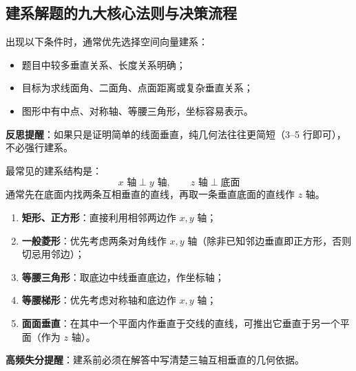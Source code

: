 \documentclass[11pt,a4paper]{ctexart}
\begin{document}
\subsection{建系解题的九大核心法则与决策流程}

\begin{tcolorbox}[colback=white,colframe=rulecolor,boxrule=0.55pt,arc=1mm,title={一、判断是否适合建系},fonttitle=\bfseries]
出现以下条件时，通常优先选择空间向量建系：
\begin{itemize}[leftmargin=2em, itemsep=0.1em]
  \item 题目中较多垂直关系、长度关系明确；
  \item 目标为求线面角、二面角、点面距离或复杂垂直关系；
  \item 图形中有中点、对称轴、等腰三角形，坐标容易表示。
\end{itemize}
\textbf{反思提醒}：如果只是证明简单的线面垂直，纯几何法往往更简短（3--5 行即可），不必强行建系。
\end{tcolorbox}

\begin{tcolorbox}[colback=white,colframe=rulecolor,boxrule=0.55pt,arc=1mm,title={二、建系的核心：先找三条两两垂直的方向},fonttitle=\bfseries]
最常见的建系结构是：
\[
  x\text{ 轴} \perp y\text{ 轴}, \qquad z\text{ 轴} \perp \text{底面}
\]
通常先在底面内找两条互相垂直的直线，再取一条垂直底面的直线作 $z$ 轴。
\begin{enumerate}[label=\arabic*. , leftmargin=2em, itemsep=0.1em]
  \item \textbf{矩形、正方形}：直接利用相邻两边作 $x,y$ 轴；
  \item \textbf{一般菱形}：优先考虑两条对角线作 $x,y$ 轴（除非已知邻边垂直即正方形，否则切忌用邻边）；
  \item \textbf{等腰三角形}：取底边中线垂直底边，作坐标轴；
  \item \textbf{等腰梯形}：优先考虑对称轴和底边作 $x,y$ 轴；
  \item \textbf{面面垂直}：在其中一个平面内作垂直于交线的直线，可推出它垂直于另一个平面（作为 $z$ 轴）。
\end{enumerate}
\textbf{高频失分提醒}：建系前必须在解答中写清楚三轴互相垂直的几何依据。
\end{tcolorbox}
\end{document}
